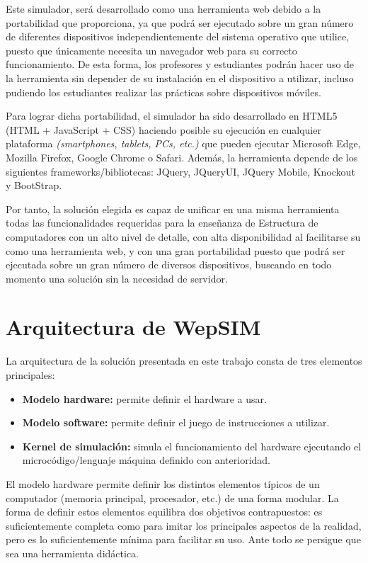 Este simulador, será desarrollado como una herramienta web debido a la portabilidad que proporciona, ya que podrá ser ejecutado sobre un gran número de diferentes dispositivos independientemente del sistema operativo que utilice, puesto que únicamente necesita un navegador web para su correcto funcionamiento. De esta forma, los profesores y estudiantes podrán hacer uso de la herramienta sin depender de su instalación en el dispositivo a utilizar, incluso pudiendo los estudiantes realizar las prácticas sobre dispositivos móviles.

Para lograr dicha portabilidad, el simulador ha sido desarrollado en HTML5 (HTML + JavaScript + CSS) haciendo posible su ejecución en cualquier plataforma \emph{(smartphones, tablets, PCs, etc.)} que pueden ejecutar Microsoft Edge, Mozilla Firefox, Google Chrome o Safari. Además, la herramienta depende de los siguientes frameworks/bibliotecas: JQuery, JQueryUI, JQuery Mobile, Knockout y BootStrap.

Por tanto, la solución elegida es capaz de unificar en una misma herramienta todas las funcionalidades requeridas para la enseñanza de Estructura de computadores con un alto nivel de detalle, con alta disponibilidad al facilitarse su como una herramienta web, y con una gran portabilidad puesto que podrá ser ejecutada sobre un gran número de diversos dispositivos, buscando en todo momento una solución sin la necesidad de servidor.

\section{Arquitectura de WepSIM}
\label{sec:simulator_architecture}

La arquitectura de la solución presentada en este trabajo consta de tres elementos principales:

\begin{itemize}
\item \textbf{Modelo hardware:} permite definir el hardware a usar.
\item \textbf{Modelo software:} permite definir el juego de instrucciones a utilizar.
\item \textbf{Kernel de simulación:} simula el funcionamiento del hardware ejecutando el microcódigo/lenguaje máquina definido con anterioridad.
\end{itemize}

El modelo hardware permite definir los distintos elementos típicos de un computador (memoria principal, procesador, etc.) de una forma modular. La forma de definir estos elementos equilibra dos objetivos contrapuestos: es suficientemente completa como para imitar los principales aspectos de la realidad, pero es lo suficientemente mínima para facilitar su uso. Ante todo se persigue que sea una herramienta didáctica.

